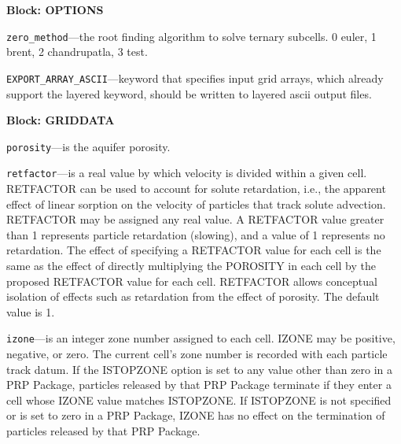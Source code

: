 
\item \textbf{Block: OPTIONS}

\begin{description}
\item \texttt{zero\_method}---the root finding algorithm to solve ternary subcells.  0 euler, 1 brent, 2 chandrupatla, 3 test.

\item \texttt{EXPORT\_ARRAY\_ASCII}---keyword that specifies input grid arrays, which already support the layered keyword, should be written to layered ascii output files.

\end{description}
\item \textbf{Block: GRIDDATA}

\begin{description}
\item \texttt{porosity}---is the aquifer porosity.

\item \texttt{retfactor}---is a real value by which velocity is divided within a given cell.  RETFACTOR can be used to account for solute retardation, i.e., the apparent effect of linear sorption on the velocity of particles that track solute advection.  RETFACTOR may be assigned any real value.  A RETFACTOR value greater than 1 represents particle retardation (slowing), and a value of 1 represents no retardation.  The effect of specifying a RETFACTOR value for each cell is the same as the effect of directly multiplying the POROSITY in each cell by the proposed RETFACTOR value for each cell.  RETFACTOR allows conceptual isolation of effects such as retardation from the effect of porosity.  The default value is 1.

\item \texttt{izone}---is an integer zone number assigned to each cell.  IZONE may be positive, negative, or zero.  The current cell's zone number is recorded with each particle track datum.  If the ISTOPZONE option is set to any value other than zero in a PRP Package, particles released by that PRP Package terminate if they enter a cell whose IZONE value matches ISTOPZONE.  If ISTOPZONE is not specified or is set to zero in a PRP Package, IZONE has no effect on the termination of particles released by that PRP Package.

\end{description}

